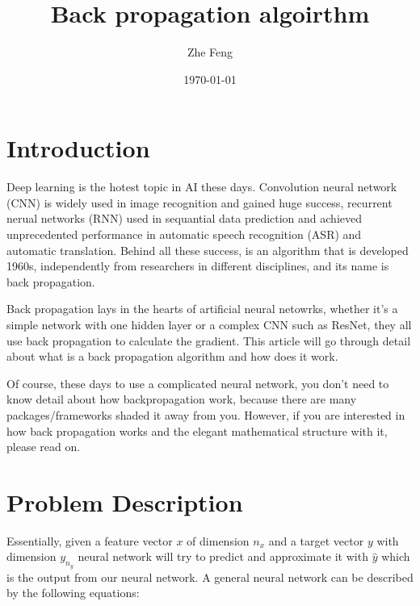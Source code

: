 \documentclass{article} [10pt] %
\title{Back propagation algoirthm}
\author{Zhe Feng}
\date{\today}
\begin{document}
\noindent
\maketitle
\section{Introduction}
Deep learning is the hotest topic in AI these days. Convolution neural network (CNN) is widely used in image recognition and gained huge success, recurrent nerual networks (RNN) used in sequantial data prediction and achieved unprecedented performance in automatic speech recognition (ASR) and automatic translation. Behind all these success, is an algorithm that is developed 1960s, independently from researchers in different disciplines, and its name is back propagation.

Back propagation lays in the hearts of artificial neural netowrks, whether it's a simple network with one hidden layer or a complex CNN such as ResNet, they all use back propagation to calculate the gradient. This article will go through detail about what is a back propagation algorithm and how does it work.

Of course, these days to use a complicated neural network, you don't need to know detail about how backpropagation work, because there are many packages/frameworks shaded it away from you. However, if you are interested in how back propagation works and the elegant mathematical structure with it, please read on.

\section{Problem Description}	\label{sec:problem_ddescription}
Essentially, given a feature vector $x$ of dimension $n_x$ and a target vector $y$ with dimension $y_{n_y}$ neural network will try to predict and approximate it with $\hat{y}$ which is the output from our neural network. A general neural network can be described by the following equations:
\end{document}

